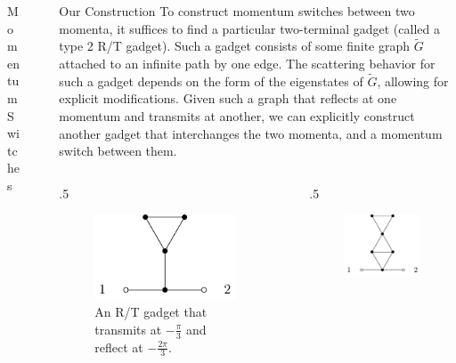 \documentclass{beamer}
\newlength{\sepwid}
\newlength{\onecolwid}
\newlength{\twocolwid}
\begin{document}
\begin{frame}[t]
\begin{columns}[t]
\begin{column}{\onecolwid}
\begin{block}{Momentum Switches}
        
    \end{block}
  \end{column}
    \begin{column}{\sepwid}\end{column}
    \begin{column}{\twocolwid}
      \begin{block}{Our Construction}
        To construct momentum switches between two momenta, it suffices to find a particular two-terminal gadget (called a type 2 R/T gadget). Such a gadget consists of some finite graph $\tilde{G}$ attached to an infinite path by one edge.  The scattering behavior for such a gadget depends on the form of the eigenstates of $\tilde{G}$, allowing for explicit modifications.  Given such a graph that reflects at one momentum and transmits at another, we can explicitly construct another gadget that interchanges the two momenta, and a momentum switch between them.
      \end{block}
      \begin{columns}[t]
      \begin{column}{.5\onecolwid}
        \begin{figure}
          \includegraphics[height=.25\onecolwid]{example_rt.pdf}
          \caption{An R/T gadget that transmits at $-\frac{\pi}{3}$ and reflect at $-\frac{2\pi}{3}$.}
        \end{figure}
      \end{column}
      \begin{column}{\sepwid}
      \end{column}
      \begin{column}{.5\onecolwid}
        \begin{figure}
          \includegraphics[height=.25\onecolwid]{example_tr.pdf}

\end{figure}
\end{column}
\end{columns}
\end{column}
\end{columns}
\end{frame}
\end{document}
